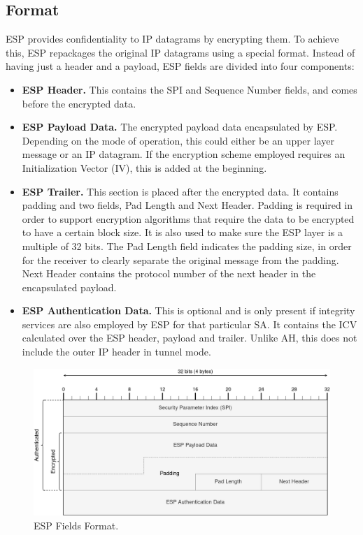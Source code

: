 \documentclass[a4paper,12pt]{report}
\begin{document}
		\subsection{Format}
		ESP provides confidentiality to IP datagrams by encrypting them. To achieve this, ESP repackages the original IP datagrams using a special format. Instead of having just a header and a payload, ESP fields are divided into four components:
		\begin{itemize}
			\item \textbf{ESP Header.} This contains the SPI and Sequence Number fields, and comes before the encrypted data.
			\item \textbf{ESP Payload Data.} The encrypted payload data encapsulated by ESP. Depending on the mode of operation, this could either be an upper layer message or an IP datagram. If the encryption scheme employed requires an Initialization Vector (IV), this is added at the beginning.
			\item \textbf{ESP Trailer.} This section is placed after the encrypted data. It contains padding and two fields, Pad Length and Next Header. Padding is required in order to support encryption algorithms that require the data to be encrypted to have a certain block size. It is also used to make sure the ESP layer is a multiple of 32 bits. The Pad Length field indicates the padding size, in order for the receiver to clearly separate the original message from the padding. Next Header contains the protocol number of the next header in the encapsulated payload.
			\item \textbf{ESP Authentication Data.} This is optional and is only present if integrity services are also employed by ESP for that particular SA. It contains the ICV calculated over the ESP header, payload and trailer. Unlike AH, this does not include the outer IP header in tunnel mode.
		\end{itemize}
		
		\begin{figure}[h]
			\includegraphics[width=\textwidth]{esp_format}
			\centering
			\caption{ESP Fields Format.}
		\end{figure}
\newpage
\end{document}
